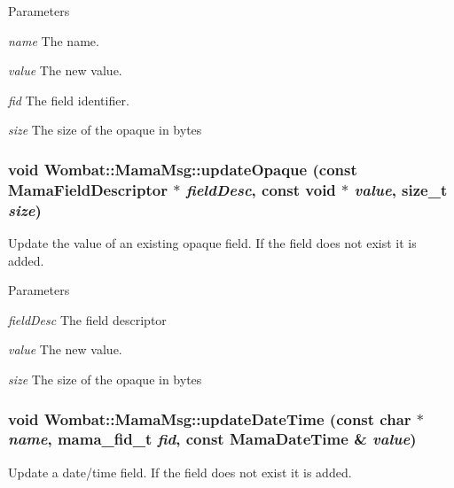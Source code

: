 \begin{DoxyParams}{Parameters}
\item[{\em name}]The name. \item[{\em value}]The new value. \item[{\em fid}]The field identifier. \item[{\em size}]The size of the opaque in bytes \end{DoxyParams}
\hypertarget{classWombat_1_1MamaMsg_aab8feabfff6d06eec8650ea429d74089}{
\subsubsection[{updateOpaque}]{\setlength{\rightskip}{0pt plus 5cm}void Wombat::MamaMsg::updateOpaque (const {\bf MamaFieldDescriptor} $\ast$ {\em fieldDesc}, \/  const void $\ast$ {\em value}, \/  size\_\-t {\em size})}}
\label{classWombat_1_1MamaMsg_aab8feabfff6d06eec8650ea429d74089}


Update the value of an existing opaque field. If the field does not exist it is added.


\begin{DoxyParams}{Parameters}
\item[{\em fieldDesc}]The field descriptor \item[{\em value}]The new value. \item[{\em size}]The size of the opaque in bytes \end{DoxyParams}
\hypertarget{classWombat_1_1MamaMsg_a11816449485c0d340ab253c017dd9648}{
\subsubsection[{updateDateTime}]{\setlength{\rightskip}{0pt plus 5cm}void Wombat::MamaMsg::updateDateTime (const char $\ast$ {\em name}, \/  mama\_\-fid\_\-t {\em fid}, \/  const {\bf MamaDateTime} \& {\em value})}}
\label{classWombat_1_1MamaMsg_a11816449485c0d340ab253c017dd9648}


Update a date/time field. If the field does not exist it is added.


